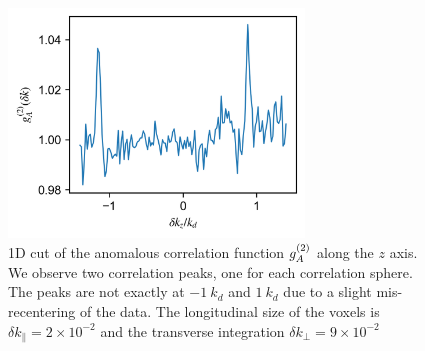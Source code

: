     
  
   
   
   
    



\begin{figure}
    \centering
    \includegraphics[width=0.7\textwidth]{Fig/Chapter4/kmk_kapitza.png}
    \caption{1D cut of the anomalous correlation function $g^{(2)}_A$ along the $z$ axis. We observe two correlation peaks, one for each correlation sphere. The peaks are not exactly at $-1 \ k_d$ and $1 \ k_d$ due to a slight mis-recentering of the data. The longitudinal size of the voxels is $\delta k_{\parallel}= 2 \times 10^{-2}$ and the transverse integration $\delta k_{\perp}= 9 \times 10^{-2}$}
    \label{fig:kmk_kapitza}
\end{figure}




